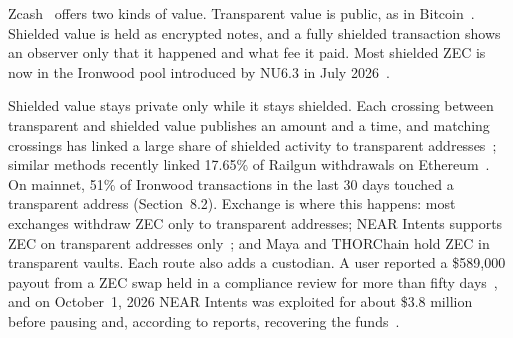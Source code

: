\documentclass[10pt,letterpaper]{article}
\makeatletter
\renewcommand\section{\@startsection{section}{1}{\z@}{-1.3em}{0.45em}{\normalfont\large\bfseries}}
\theoremstyle{plain}
\theoremstyle{definition}
\makeatother
\begin{document}
\section{Introduction}

Zcash~\cite{zerocash,spec} offers two kinds of value. Transparent value is public, as in
Bitcoin~\cite{bitcoin}. Shielded value is held as encrypted notes, and a fully shielded transaction
shows an observer only that it happened and what fee it paid. Most shielded ZEC is now in
the Ironwood pool introduced by NU6.3 in July 2026~\cite{zip258}.

Shielded value stays private only while it stays shielded. Each crossing between transparent
and shielded value publishes an amount and a time, and matching crossings has linked a large
share of shielded activity to transparent addresses~\cite{kappos,quesnelle,biryukov}; similar
methods recently linked 17.65\% of Railgun withdrawals on Ethereum~\cite{railgun}. On mainnet,
51\% of Ironwood transactions in the last 30 days touched a transparent address
(Section~8.2). Exchange is where this happens: most exchanges withdraw ZEC only to transparent
addresses; NEAR Intents supports ZEC on transparent addresses only~\cite{nearchains}; and Maya
and THORChain hold ZEC in transparent vaults. Each route also adds a custodian. A user reported
a \$589{,}000 payout from a ZEC swap held in a compliance review for more than fifty
days~\cite{freeze}, and on October~1, 2026 NEAR Intents was exploited for about \$3.8 million
before pausing and, according to reports, recovering the funds~\cite{nearexploit}.
\end{document}
